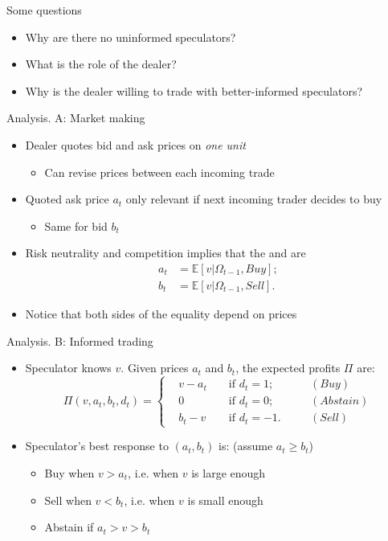 \documentclass[english,10pt]{beamer}
\begin{document}
\begin{frame}{Some questions}
\begin{itemize}
	\item Why are there no uninformed speculators?
	\item What is the role of the dealer?
	\item Why is the dealer willing to trade with better-informed speculators?
\end{itemize}
\end{frame}


\begin{frame}{Analysis. A: Market making}
\begin{itemize}
	\item Dealer quotes bid and ask prices on \textit{one unit}
	\begin{itemize}
		\item Can revise prices between each incoming trade
	\end{itemize}
	\item Quoted ask price $a_t$ only relevant if next incoming trader decides to buy
	\begin{itemize}
		\item Same for bid $b_t$
	\end{itemize}
	\item Risk neutrality and competition implies that the  and  are
	\begin{align*}
		a_t & = \mathbb{E}[v|\Omega_{t-1}, Buy]; \\
		b_t &= \mathbb{E}[v|\Omega_{t-1},  Sell].
	\end{align*}
	\item Notice that both sides of the equality depend on prices
\end{itemize}
\end{frame}


\begin{frame}{Analysis. B: Informed trading}
\begin{itemize}
	\item Speculator knows $v$. Given prices $a_t$ and $b_t$, the expected profits $\Pi$ are:
	\begin{equation*}
		\Pi(v,a_t,b_t,d_t)= \left\{
		\begin{aligned}
		&v - a_t  	&& \text{ if } d_t=1; \quad && (Buy)\\
		&0			&&\text{ if } d_t=0; \quad && (Abstain)\\
		&b_t - v 	&& \text{ if } d_t=-1. \quad && (Sell)
		\end{aligned}
		\right.
	\end{equation*}
	\item Speculator's best response to $(a_t,b_t)$ is: (assume $a_t \geq b_t$)
	\begin{itemize}
		\item Buy when $v > a_t$, i.e. when $v$ is large enough
		\item Sell when $v<b_t$, i.e. when $v$ is small enough
		\item Abstain if $a_t > v > b_t$
	\end{itemize}
\end{itemize}
\end{frame}
\end{document}

